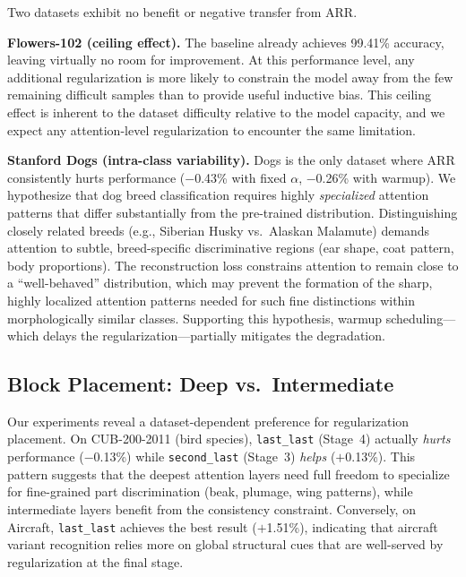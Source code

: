 \documentclass[review,12pt,authoryear]{elsarticle}
\newcommand{\method}{ARR}
\begin{document}
Two datasets exhibit no benefit or negative transfer from \method{}.

\textbf{Flowers-102 (ceiling effect).}
The baseline already achieves 99.41\% accuracy, leaving virtually no room for improvement.
At this performance level, any additional regularization is more likely to constrain the model away from the few remaining difficult samples than to provide useful inductive bias.
This ceiling effect is inherent to the dataset difficulty relative to the model capacity, and we expect any attention-level regularization to encounter the same limitation.

\textbf{Stanford Dogs (intra-class variability).}
Dogs is the only dataset where \method{} consistently hurts performance ($-$0.43\% with fixed $\alpha$, $-$0.26\% with warmup).
We hypothesize that dog breed classification requires highly \emph{specialized} attention patterns that differ substantially from the pre-trained distribution.
Distinguishing closely related breeds (e.g., Siberian Husky vs.\ Alaskan Malamute) demands attention to subtle, breed-specific discriminative regions (ear shape, coat pattern, body proportions).
The reconstruction loss constrains attention to remain close to a ``well-behaved'' distribution, which may prevent the formation of the sharp, highly localized attention patterns needed for such fine distinctions within morphologically similar classes.
Supporting this hypothesis, warmup scheduling---which delays the regularization---partially mitigates the degradation.

\subsection{Block Placement: Deep vs.\ Intermediate}
\label{sec:disc:placement}

Our experiments reveal a dataset-dependent preference for regularization placement.
On CUB-200-2011 (bird species), \texttt{last\_last} (Stage~4) actually \emph{hurts} performance ($-$0.13\%) while \texttt{second\_last} (Stage~3) \emph{helps} ($+$0.13\%).
This pattern suggests that the deepest attention layers need full freedom to specialize for fine-grained part discrimination (beak, plumage, wing patterns), while intermediate layers benefit from the consistency constraint.
Conversely, on Aircraft, \texttt{last\_last} achieves the best result ($+$1.51\%), indicating that aircraft variant recognition relies more on global structural cues that are well-served by regularization at the final stage.
\end{document}
